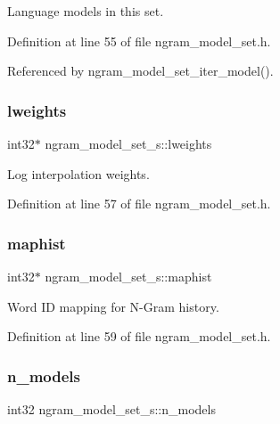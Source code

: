Language models in this set. 



Definition at line 55 of file ngram\+\_\+model\+\_\+set.\+h.



Referenced by ngram\+\_\+model\+\_\+set\+\_\+iter\+\_\+model().

\mbox{\label{structngram__model__set__s_a11068bb0029c788c506bec4507dd6d23}} 
\subsubsection{lweights}
{\footnotesize\ttfamily int32$\ast$ ngram\+\_\+model\+\_\+set\+\_\+s\+::lweights}



Log interpolation weights. 



Definition at line 57 of file ngram\+\_\+model\+\_\+set.\+h.

\mbox{\label{structngram__model__set__s_af34ca232338c2d8c7dc8d13869ac09fd}} 
\subsubsection{maphist}
{\footnotesize\ttfamily int32$\ast$ ngram\+\_\+model\+\_\+set\+\_\+s\+::maphist}



Word ID mapping for N-\/\+Gram history. 



Definition at line 59 of file ngram\+\_\+model\+\_\+set.\+h.

\mbox{\label{structngram__model__set__s_a6c28858d5631a9c9dbc7b2c9583f5c5a}} 
\subsubsection{n\+\_\+models}
{\footnotesize\ttfamily int32 ngram\+\_\+model\+\_\+set\+\_\+s\+::n\+\_\+models}



